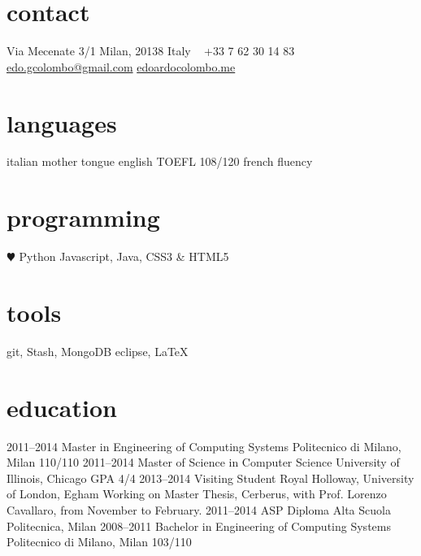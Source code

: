\documentclass[]{friggeri-cv} %
\begin{document}


\begin{aside} %
\section{contact}
Via Mecenate 3/1
Milan, 20138
Italy
~
+33 7 62 30 14 83
~
\href{mailto:edo.gcolombo@gmail.com}{edo.gcolombo@gmail.com}
\href{http://edoardocolombo.me}{edoardocolombo.me}
\section{languages}
italian mother tongue
english TOEFL 108/120
french fluency
\section{programming}
{\color{red} $\varheartsuit$} Python
Javascript, Java,
CSS3 \& HTML5
\section{tools}
git, Stash, MongoDB
eclipse, \LaTeX
\end{aside}


\section{education}

\begin{entrylist}
\entry
{2011--2014}
{Master {\normalfont in Engineering of Computing Systems}}
{Politecnico di Milano, Milan}
{110/110}
\entry
{2011--2014}
{Master of Science {\normalfont in Computer Science}}
{University of Illinois, Chicago}
{GPA 4/4}
\entry
{2013--2014}
{Visiting Student}
{Royal Holloway, University of London, Egham}
{Working on Master Thesis, Cerberus, with Prof. Lorenzo Cavallaro, from November to February.}
\entry
{2011--2014}
{ASP Diploma}
{Alta Scuola Politecnica, Milan}
{}
\entry
{2008--2011}
{Bachelor {\normalfont in Engineering of Computing Systems}}
{Politecnico di Milano, Milan}
{103/110}

\end{entrylist}
\end{document}
